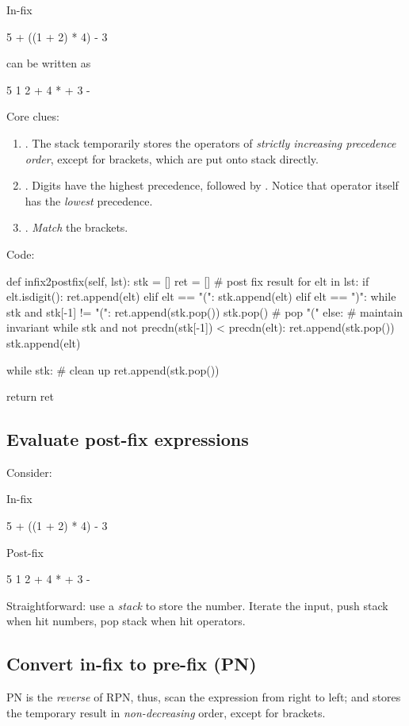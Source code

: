 In-fix
\begin{python}
5 + ((1 + 2) * 4) - 3
\end{python}

can be written as
\begin{python}
5 1 2 + 4 * + 3 - 
\end{python}
Core clues:
\begin{enumerate}
\item {}. The stack temporarily stores the operators of \textit{strictly increasing precedence order}, except for brackets, which are put onto stack directly.
\item {}. Digits have the highest precedence, followed by \pyinline{*, /, +, (}. Notice that \pyinline{(} operator itself has the \textit{lowest} precedence.
\item {}. \textit{Match} the brackets. 
\end{enumerate}
Code:
\begin{python}
def infix2postfix(self, lst):
  stk = []
  ret = []  # post fix result
  for elt in lst:
    if elt.isdigit():
      ret.append(elt)
    elif elt == "(":
      stk.append(elt)
    elif elt == ")":
      while stk and stk[-1] != "(":
        ret.append(stk.pop())
      stk.pop()  # pop "("
    else:
      # maintain invariant
      while stk and not precdn(stk[-1]) < precdn(elt):
        ret.append(stk.pop())
      stk.append(elt)

  while stk:  # clean up 
    ret.append(stk.pop())

  return ret
\end{python}

\subsection{Evaluate post-fix expressions}\label{section:evaluationPostFix}
Consider: 

In-fix
\begin{python}
5 + ((1 + 2) * 4) - 3
\end{python}

Post-fix
\begin{python}
5 1 2 + 4 * + 3 - 
\end{python}
Straightforward: use a \textit{stack} to store the number. Iterate the input, push
stack when hit numbers, pop stack when hit operators.

\subsection{Convert in-fix to pre-fix (PN)}
PN is the \textit{reverse} of RPN, thus, scan the expression from right to left; and  stores the temporary result in \textit{non-decreasing} order, except for brackets.


